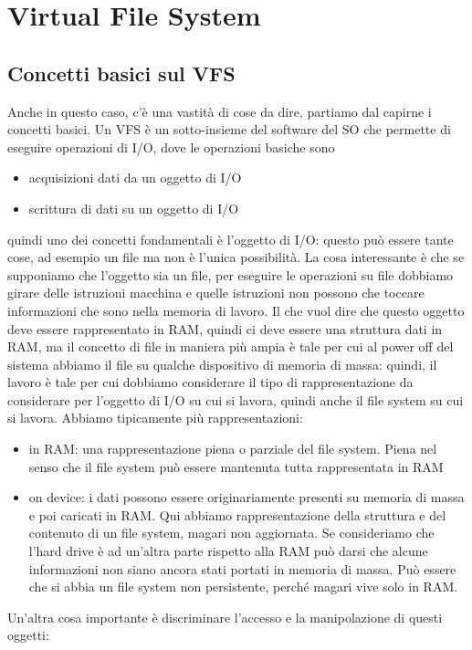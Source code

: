\documentclass[12pt, oneside]{extbook}
\begin{document}
\chapter{Virtual File System}
\section{Concetti basici sul VFS}
Anche in questo caso, c'è una vastità di cose da dire, partiamo dal capirne i concetti basici. Un VFS è un sotto-insieme del software del SO che permette di eseguire operazioni di I/O, dove le operazioni basiche sono
\begin{itemize}
\item acquisizioni dati da un oggetto di I/O
\item scrittura di dati su un oggetto di I/O
\end{itemize}
quindi uno dei concetti fondamentali è l'oggetto di I/O: questo può essere tante cose, ad esempio un file ma non è l'unica possibilità. La cosa interessante è che se supponiamo che l'oggetto sia un file, per eseguire le operazioni su file dobbiamo girare delle istruzioni macchina e quelle istruzioni non possono che toccare informazioni che sono nella memoria di lavoro. Il che vuol dire che questo oggetto deve essere rappresentato in RAM, quindi ci deve essere una struttura dati in RAM, ma il concetto di file in maniera più ampia  è tale per cui al power off del sistema abbiamo il file su qualche dispositivo di memoria di massa: quindi, il lavoro è tale per cui dobbiamo considerare il tipo di rappresentazione da considerare per l'oggetto di I/O su cui si lavora, quindi anche il file system su cui si lavora. Abbiamo tipicamente più rappresentazioni:
\begin{itemize}
\item in RAM: una rappresentazione piena o parziale del file system. Piena nel senso che il file system può essere mantenuta tutta rappresentata in RAM
\item on device: i dati possono essere originariamente presenti su memoria di massa e poi caricati in RAM. Qui abbiamo rappresentazione della struttura e del contenuto di un file system, magari non aggiornata. Se consideriamo che l'hard drive è ad un'altra parte rispetto alla RAM può darsi che alcune informazioni non siano ancora stati portati in memoria di massa. Può essere che si abbia un file system non persistente, perché magari vive solo in RAM.
\end{itemize}
Un'altra cosa importante è discriminare l'accesso e la manipolazione di questi oggetti:
\end{document}
